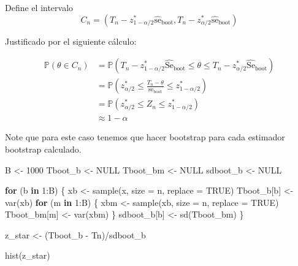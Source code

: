\documentclass[
  12pt,
]{book}
\newenvironment{Shaded}{\begin{snugshade}}{\end{snugshade}}
\newcommand{\AttributeTok}[1]{\textcolor[rgb]{0.77,0.63,0.00}{#1}}
\newcommand{\ConstantTok}[1]{\textcolor[rgb]{0.00,0.00,0.00}{#1}}
\newcommand{\ControlFlowTok}[1]{\textcolor[rgb]{0.13,0.29,0.53}{\textbf{#1}}}
\newcommand{\DecValTok}[1]{\textcolor[rgb]{0.00,0.00,0.81}{#1}}
\newcommand{\FunctionTok}[1]{\textcolor[rgb]{0.00,0.00,0.00}{#1}}
\newcommand{\NormalTok}[1]{#1}
\newcommand{\OtherTok}[1]{\textcolor[rgb]{0.56,0.35,0.01}{#1}}
\newcommand{\SpecialCharTok}[1]{\textcolor[rgb]{0.00,0.00,0.00}{#1}}
\begin{document}
Define el intervalo \begin{equation*}
C_{n}=\left(T_{n}-z_{1-\alpha / 2}^{*} \widehat{\mathrm{se}}_{\mathrm{boot}}, T_{n}-z_{\alpha / 2}^{*} \widehat{\mathrm{se}}_{\mathrm{boot}}\right)
\end{equation*}

Justificado por el siguiente cálculo:

\begin{align*}
\mathbb{P}\left(\theta \in C_{n}\right) &=\mathbb{P}\left(T_{n}-z_{1-\alpha / 2}^{*} \widehat{\mathrm{Se}}_{\mathrm{boot}} \leq \theta \leq T_{n}-z_{\alpha / 2}^{*} \widehat{\mathrm{Se}}_{\mathrm{boot}}\right) \\
&=\mathbb{P}\left(z_{\alpha / 2}^{*} \leq \frac{T_{n}-\theta}{\mathrm{se}_{\mathrm{boot}}} \leq z_{1-\alpha / 2}^{*}\right) \\
&=\mathbb{P}\left(z_{\alpha / 2}^{*} \leq Z_{n} \leq z_{1-\alpha / 2}^{*}\right) \\
& \approx 1-\alpha
\end{align*}

Note que para este caso tenemos que hacer bootstrap para cada estimador
bootstrap calculado.

\begin{Shaded}
\begin{Highlighting}[]
\NormalTok{B }\OtherTok{\textless{}{-}} \DecValTok{1000}
\NormalTok{Tboot\_b }\OtherTok{\textless{}{-}} \ConstantTok{NULL}
\NormalTok{Tboot\_bm }\OtherTok{\textless{}{-}} \ConstantTok{NULL}
\NormalTok{sdboot\_b }\OtherTok{\textless{}{-}} \ConstantTok{NULL}

\ControlFlowTok{for}\NormalTok{ (b }\ControlFlowTok{in} \DecValTok{1}\SpecialCharTok{:}\NormalTok{B) \{}
\NormalTok{    xb }\OtherTok{\textless{}{-}} \FunctionTok{sample}\NormalTok{(x, }\AttributeTok{size =}\NormalTok{ n, }\AttributeTok{replace =} \ConstantTok{TRUE}\NormalTok{)}
\NormalTok{    Tboot\_b[b] }\OtherTok{\textless{}{-}} \FunctionTok{var}\NormalTok{(xb)}
    \ControlFlowTok{for}\NormalTok{ (m }\ControlFlowTok{in} \DecValTok{1}\SpecialCharTok{:}\NormalTok{B) \{}
\NormalTok{        xbm }\OtherTok{\textless{}{-}} \FunctionTok{sample}\NormalTok{(xb, }\AttributeTok{size =}\NormalTok{ n, }\AttributeTok{replace =} \ConstantTok{TRUE}\NormalTok{)}
\NormalTok{        Tboot\_bm[m] }\OtherTok{\textless{}{-}} \FunctionTok{var}\NormalTok{(xbm)}
\NormalTok{    \}}
\NormalTok{    sdboot\_b[b] }\OtherTok{\textless{}{-}} \FunctionTok{sd}\NormalTok{(Tboot\_bm)}
\NormalTok{\}}

\NormalTok{z\_star }\OtherTok{\textless{}{-}}\NormalTok{ (Tboot\_b }\SpecialCharTok{{-}}\NormalTok{ Tn)}\SpecialCharTok{/}\NormalTok{sdboot\_b}

\FunctionTok{hist}\NormalTok{(z\_star)}
\end{Highlighting}
\end{Shaded}
\end{document}
